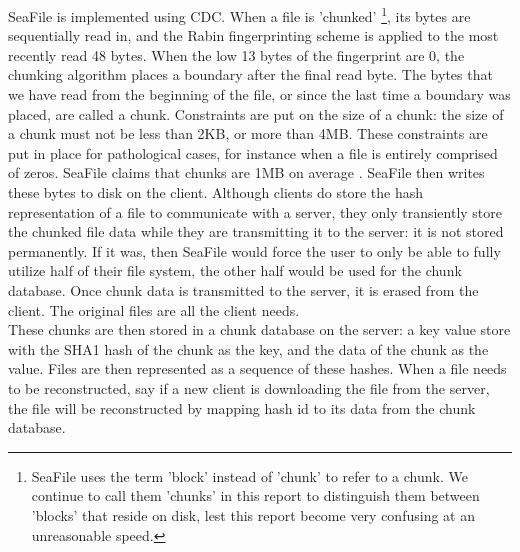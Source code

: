 \documentclass[table]{article}
\begin{document}
\begin{multicols}{2}
SeaFile is implemented using CDC. When a file is 'chunked' \footnote{SeaFile uses the term 'block' instead of 'chunk' to refer to a chunk. We continue to call them 'chunks' in this report to distinguish them between 'blocks' that reside on disk, lest this report become very confusing at an unreasonable speed.}, its bytes are sequentially read in, and the Rabin fingerprinting scheme is applied to the most recently read 48 bytes. When the low 13 bytes of the fingerprint are 0, the chunking algorithm places a boundary after the final read byte. The bytes that we have read from the beginning of the file, or since the last time a boundary was placed, are called a chunk. Constraints are put on the size of a chunk: the size of a chunk must not be less than 2KB, or more than 4MB. These constraints are put in place for pathological cases, for instance when a file is entirely comprised of zeros. SeaFile claims that chunks are 1MB on average \cite{SeaFile-data-model}. SeaFile then writes these bytes to disk on the client. Although clients do store the hash representation of a file to communicate with a server, they only transiently store the chunked file data while they are transmitting it to the server: it is not stored permanently. If it was, then SeaFile would force the user to only be able to fully utilize half of their file system, the other half would be used for the chunk database. Once chunk data is transmitted to the server, it is erased from the client. The original files are all the client needs.\\

These chunks are then stored in a chunk database on the server: a key value store with the SHA1 hash of the chunk as the key, and the data of the chunk as the value. Files are then represented as a sequence of these hashes. When a file needs to be reconstructed, say if a new client is downloading the file from the server, the file will be reconstructed by mapping hash id to its data from the chunk database.\\


\end{multicols}
\end{document}
